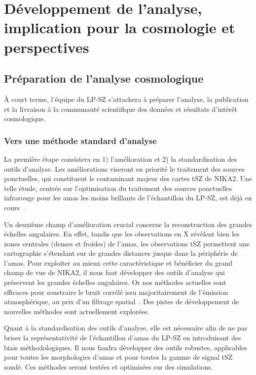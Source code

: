 \section{Développement de l'analyse, implication pour la cosmologie et perspectives}

\subsection{Préparation de l'analyse cosmologique}

\`A court terme, l'équipe du LP-SZ s'attachera à préparer l'analyse, la
publication et la livraison à la communauté scientifique des données
et résultats d'intérêt cosmologique.

\subsubsection{Vers une méthode standard d'analyse}
La première étape consistera en 1)
l'amélioration et 2) la standardisation des outils d'analyse. Les
améliorations viseront en priorité le traitement des sources
ponctuelles, qui constituent le contaminant majeur des cartes tSZ de
NIKA2. Une telle étude, centrée sur l'optimisation du traitement des
sources ponctuelles infrarouge pour les amas les moins brillants de
l'échantillon du LP-SZ, est déjà en cours~\citep{Keruzore2020}.

Un deuxième champ d'amélioration crucial concerne la reconstruction
des grandes échelles angulaires. En effet, tandis que les observations en X
révèlent bien les zones centrales (denses et froides) de l'amas, les
observations tSZ permettent une cartographie s'étendant sur de grandes
distances jusque dans la périphérie de l'amas. Pour exploiter au mieux
cette caractéristique et bénéficier du grand champ de vue de NIKA2, il
nous faut développer des outils d'analyse qui préservent les grandes
échelles angulaires. Or nos méthodes actuelles sont efficaces pour
soustraire le bruit corrélé issu majoritairement de l'émission
atmosphérique, au prix d'un filtrage spatial~\citep[voir par
  exemple][]{Ruppin2018}. Des pistes de développement de nouvelles
méthodes sont actuellement explorées.

Quant à la standardisation des outils d'analyse, elle est nécessaire
afin de ne pas briser la représentativité de l'échantillon d'amas du
LP-SZ en introduisant des biais méthodologiques. Il nous faudra
développer des outils robustes, applicables pour toutes les
morphologies d'amas et pour toutes la gamme de signal tSZ sondé. Ces
méthodes seront testées et optimisées sur des simulations.

